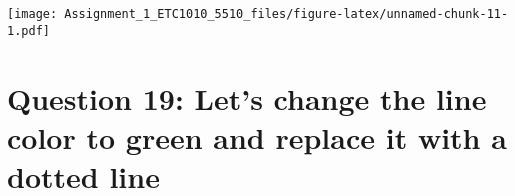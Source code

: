 \documentclass[
]{article}
\newenvironment{Shaded}{\begin{snugshade}}{\end{snugshade}}
\newcommand{\CommentTok}[1]{\textcolor[rgb]{0.56,0.35,0.01}{\textit{#1}}}
\newcommand{\DataTypeTok}[1]{\textcolor[rgb]{0.13,0.29,0.53}{#1}}
\newcommand{\KeywordTok}[1]{\textcolor[rgb]{0.13,0.29,0.53}{\textbf{#1}}}
\newcommand{\NormalTok}[1]{#1}
\newcommand{\OperatorTok}[1]{\textcolor[rgb]{0.81,0.36,0.00}{\textbf{#1}}}
\newcommand{\StringTok}[1]{\textcolor[rgb]{0.31,0.60,0.02}{#1}}
\begin{document}
\begin{Shaded}
\end{Shaded}

\texttt{[image: Assignment\_1\_ETC1010\_5510\_files/figure-latex/unnamed-chunk-11-1.pdf]}

\hypertarget{question-19-lets-change-the-line-color-to-green-and-replace-it-with-a-dotted-line}{%
\section{Question 19: Let's change the line color to green and replace
it with a dotted
line}\label{question-19-lets-change-the-line-color-to-green-and-replace-it-with-a-dotted-line}}
\end{document}
